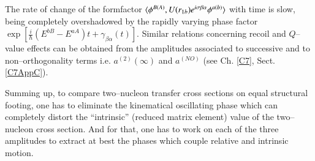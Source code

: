 The rate of change of the formfactor $\langle {\phi^{B(A)},U(r_{1b})e^{i\sigma{\beta\alpha}}\phi^{a(b)}} \rangle$ with time is slow, being completely overshadowed by the rapidly varying phase factor\\ $\exp\left[\frac{i}{\hbar}(E^{bB}-E^{aA})t+\gamma_{\beta\alpha}(t)\right]$. Similar relations concerning recoil and $Q$--value effects can be obtained from the amplitudes associated to successive and to non--orthogonality terms i.e. $a^{(2)}(\infty)$ and $a^{(NO)}$ (see Ch. \ref{C7}, Sect. \ref{C7AppC}).


Summing up, to compare two--nucleon transfer cross sections on equal structural footing, one has to eliminate the kinematical oscillating phase which can completely distort the ``intrinsic'' (reduced matrix element) value of the two--nucleon cross section. And for that, one has to work on each of the three amplitudes to extract at best the phases which couple relative and intrinsic motion.



